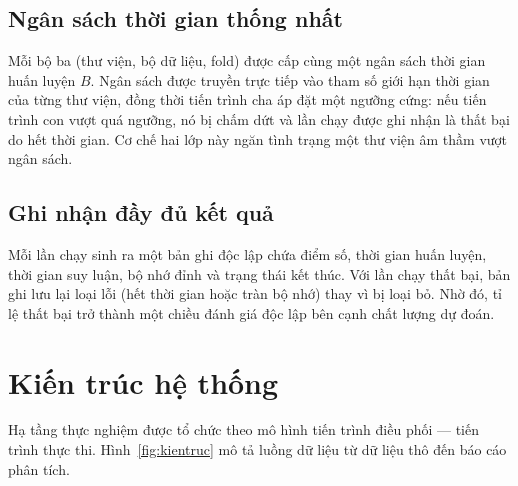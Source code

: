\subsection{Ngân sách thời gian thống nhất}
Mỗi bộ ba (thư viện, bộ dữ liệu, fold) được cấp cùng một ngân sách thời gian
huấn luyện $B$. Ngân sách được truyền trực tiếp vào tham số giới hạn thời gian của
từng thư viện, đồng thời tiến trình cha áp đặt một ngưỡng cứng: nếu tiến trình con
vượt quá ngưỡng, nó bị chấm dứt và lần chạy được ghi nhận là thất bại do hết thời
gian. Cơ chế hai lớp này ngăn tình trạng một thư viện âm thầm vượt ngân sách.

\subsection{Ghi nhận đầy đủ kết quả}
Mỗi lần chạy sinh ra một bản ghi độc lập chứa điểm số, thời gian huấn luyện, thời
gian suy luận, bộ nhớ đỉnh và trạng thái kết thúc. Với lần chạy thất bại, bản ghi
lưu lại loại lỗi (hết thời gian hoặc tràn bộ nhớ) thay vì bị loại bỏ. Nhờ đó, tỉ
lệ thất bại trở thành một chiều đánh giá độc lập bên cạnh chất lượng dự đoán.

\section{Kiến trúc hệ thống}
\label{sec:kientruc}
Hạ tầng thực nghiệm được tổ chức theo mô hình tiến trình điều phối --- tiến trình
thực thi. Hình~\ref{fig:kientruc} mô tả luồng dữ liệu từ dữ liệu thô đến báo cáo
phân tích.

